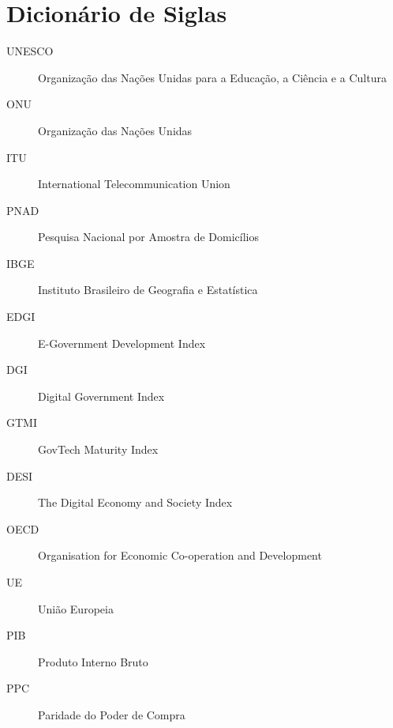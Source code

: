\section*{Dicionário de Siglas}

\begin{description}
    \item[UNESCO] Organização das Nações Unidas para a Educação, a Ciência e a Cultura
    \item[ONU] Organização das Nações Unidas
    \item[ITU] International Telecommunication Union
    \item[PNAD] Pesquisa Nacional por Amostra de Domicílios
    \item[IBGE] Instituto Brasileiro de Geografia e Estatística
    \item[EDGI] E-Government Development Index
    \item[DGI] Digital Government Index  
    \item[GTMI] GovTech Maturity Index
    \item[DESI] The Digital Economy and Society Index 
    \item[OECD] Organisation for Economic Co-operation and Development
    \item[UE] União Europeia 
    \item[PIB] Produto Interno Bruto 
    \item[PPC] Paridade do Poder de Compra 
\end{description}